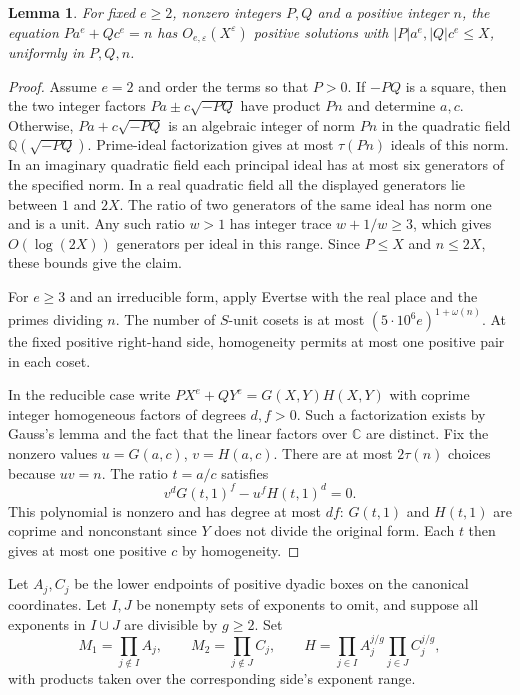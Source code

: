 \documentclass[11pt,reqno]{amsart}
\newtheorem{lemma}[theorem]{Lemma}
\newcommand{\eps}{\varepsilon}
\newcommand{\Q}{\mathbb Q}
\newcommand{\C}{\mathbb C}
\begin{document}
\begin{lemma}\label{lem:edge}
For fixed \(e\ge2\), nonzero integers \(P,Q\) and a positive integer \(n\),
the equation \(P a^e+Q c^e=n\) has \(O_{e,\eps}(X^\eps)\) positive
solutions with \(|P|a^e,|Q|c^e\le X\), uniformly in \(P,Q,n\).
\end{lemma}
\begin{proof}
Assume \(e=2\) and order the terms so that \(P>0\). If \(-PQ\) is a
square, then the two integer factors \(Pa\pm c\sqrt{-PQ}\) have
product \(Pn\) and determine \(a,c\). Otherwise, \(Pa+c\sqrt{-PQ}\)
is an algebraic integer of norm \(Pn\) in the quadratic field
\(\Q(\sqrt{-PQ})\). Prime-ideal factorization gives at most \(\tau(Pn)\)
ideals of this norm. In an imaginary quadratic field each principal
ideal has at most six generators of the specified norm. In a real
quadratic field all the displayed generators lie between \(1\) and
\(2X\). The ratio of two generators of the same ideal has norm one
and is a unit. Any such ratio \(w>1\) has integer trace \(w+1/w\ge3\),
which gives \(O(\log(2X))\) generators per ideal in this range.
Since \(P\le X\) and \(n\le2X\), these bounds give the claim.

For \(e\ge3\) and an irreducible form, apply Evertse
\cite[Theorem~1]{Ev} with the real place and the primes dividing \(n\).
The number of \(S\)-unit cosets is at most
\((5\cdot10^6e)^{1+\omega(n)}\). At the fixed positive right-hand
side, homogeneity permits at most one positive pair in each coset.

In the reducible case write \(P X^e+QY^e=G(X,Y)H(X,Y)\) with coprime
integer homogeneous factors of degrees \(d,f>0\). Such a factorization
exists by Gauss's lemma and the fact that the linear factors over \(\C\)
are distinct. Fix the nonzero values \(u=G(a,c)\), \(v=H(a,c)\).
There are at most \(2\tau(n)\) choices because \(uv=n\).
The ratio \(t=a/c\) satisfies
\[
                 v^dG(t,1)^f-u^fH(t,1)^d=0.
\]
This polynomial is nonzero and has degree at most \(df\):
\(G(t,1)\) and \(H(t,1)\) are coprime and nonconstant since
\(Y\) does not divide the original form. Each \(t\) then gives
at most one positive \(c\) by homogeneity.
\end{proof}

Let \(A_j,C_j\) be the lower endpoints of positive dyadic boxes
on the canonical coordinates. Let \(I,J\) be nonempty sets of
exponents to omit, and suppose all exponents in \(I\cup J\) are
divisible by \(g\ge2\). Set
\[
 M_1=\prod_{j\notin I}A_j,\qquad M_2=\prod_{j\notin J}C_j,\qquad
 H=\prod_{j\in I}A_j^{j/g}\prod_{j\in J}C_j^{j/g},
\]
with products taken over the corresponding side's exponent range.
\end{document}
